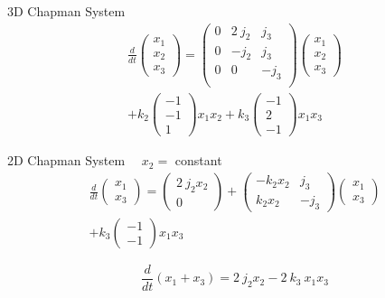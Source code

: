 \vspace{-0.3in}
\begin{block}{3D Chapman System}
\vspace{-0.2in}
\begin{align*}
\frac{d}{dt}
\left( \begin{array}{c}
x_1 \\ x_2 \\ x_3
\end{array} \right)
=
\left( \begin{array}{ccc}
0 & 2 \ j_2 & j_3 \\
0 & - j_2 & j_3 \\
0 & 0 & - j_3 \\
\end{array} \right)
\left( \begin{array}{c}
x_1 \\ x_2 \\ x_3
\end{array} \right)
\\
+
k_2
\left( \begin{array}{c}
-1 \\ -1 \\ 1 
\end{array} \right)
x_1 x_2
+
k_3
\left( \begin{array}{c}
-1 \\ 2 \\ -1 
\end{array} \right)
x_1 x_3
\end{align*}
\end{block}
\vspace{-0.1in}
\begin{block}{2D Chapman System \ \ $x_2 = $ constant}
\vspace{-0.15in}
\begin{align*}
\frac{d}{dt}
\left( \begin{array}{c}
x_1 \\ x_3
\end{array} \right)
=
\left( \begin{array}{c}
2 \ j_2 x_2 \\ 0
\end{array} \right)
+
\left( \begin{array}{cc}
- k_2 x_2 & j_3 \\
k_2 x_2 & - j_3
\end{array} \right)
\left( \begin{array}{c}
x_1 \\ x_3
\end{array} \right)
\\
+ k_3
\left( \begin{array}{c}
-1 \\ -1
\end{array} \right)
x_1 x_3
\end{align*}
\end{block}
\vspace{-0.1in}
\begin{exampleblock}{}
\begin{equation*}
\frac{d}{dt} \left( x_1 + x_3 \right)
= 2 \ j_2 x_2 - 2 \ k_3 \ x_1 x_3
\end{equation*}
\end{exampleblock}
